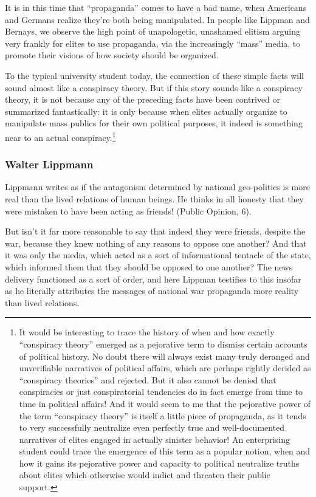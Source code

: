 \documentclass[12pt,book]{article}
\begin{document}
It is in this time that ``propaganda'' comes to have a bad name, when
Americans and Germans realize they're both being manipulated. In people
like Lippman and Bernays, we observe the high point of unapologetic,
unashamed elitism arguing very frankly for elites to use propaganda, via
the increasingly ``mass'' media, to promote their visions of how society
should be organized.

To the typical university student today, the connection of these simple
facts will sound almost like a conspiracy theory. But if this story
sounds like a conspiracy theory, it is not because any of the preceding
facts have been contrived or summarized fantastically: it is only
because when elites actually organize to manipulate mass publics for
their own political purposes, it indeed is something near to an actual
conspiracy.\footnote{It would be interesting to trace the history of
  when and how exactly ``conspiracy theory'' emerged as a pejorative
  term to dismiss certain accounts of political history. No doubt there
  will always exist many truly deranged and unverifiable narratives of
  political affairs, which are perhaps rightly derided as ``conspiracy
  theories'' and rejected. But it also cannot be denied that
  conspiracies or just conspiratorial tendencies do in fact emerge from
  time to time in political affairs! And it would seem to me that the
  pejorative power of the term ``conspiracy theory'' is itself a little
  piece of propaganda, as it tends to very successfully neutralize even
  perfectly true and well-documented narratives of elites engaged in
  actually sinister behavior! An enterprising student could trace the
  emergence of this term as a popular notion, when and how it gains its
  pejorative power and capacity to political neutralize truths about
  elites which otherwise would indict and threaten their public support.}

\subsubsection{Walter Lippmann}\label{walter-lippmann}

Lippmann writes as if the antagonism determined by national geo-politics
is more real than the lived relations of human beings. He thinks in all
honesty that they were mistaken to have been acting as friends! (Public
Opinion, 6).

But isn't it far more reasonable to say that indeed they were friends,
despite the war, because they knew nothing of any reasons to oppose one
another? And that it was only the media, which acted as a sort of
informational tentacle of the state, which informed them that they
should be opposed to one another? The news delivery functioned as a sort
of order, and here Lippman testifies to this insofar as he literally
attributes the messages of national war propaganda more reality than
lived relations.
\end{document}
